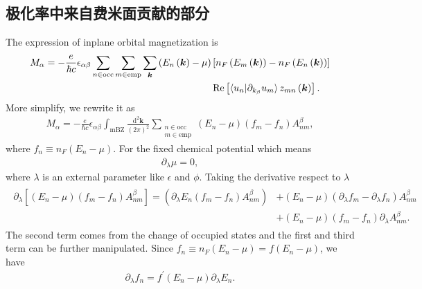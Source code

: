\documentclass[10pt, oneside]{article}
\begin{document}
\subsection{极化率中来自费米面贡献的部分}
The expression of inplane orbital magnetization is 
\begin{align}
	\begin{split}
		M_{\alpha} = -\frac{e }{\hbar c } \epsilon_{\alpha \beta} \sum_{n \in \mathrm{occ}} \sum_{m \in \mathrm{emp}} \sum_{\bm{k}} \left(E_{n } \left(\bm{k }\right) - \mu\right) & \left[n_{F } \left(E_{m } \left(\bm{k }\right)\right) - n_{F } \left(E_{n } \left(\bm{k }\right)\right)\right] \\
		& \operatorname{Re} \left[\braket{u_{n } | \partial_{k_{\beta}} u_{m} } z_{mn } \left(\bm{k }\right)	 \right].
	\end{split}
\end{align}
More simplify, we rewrite it as 
\begin{align}
	M_{\alpha} = -\frac{e }{\hbar c } \epsilon_{\alpha \beta} \int_{\mathrm{mBZ}} \frac{\mathrm{d}^{2} \bm{k}}{\left(2 \pi\right)^2} \sum_{\substack{n \in \mathrm{occ} \\ m \in \mathrm{emp}}} \left(E_{n } - \mu\right) \left(f_{m } - f_{n }\right) A^{\beta}_{nm },
\end{align}
where \(f_{n } \equiv n_{F } \left(E_{n } - \mu\right)\). For the fixed chemical potential which means 
\begin{align}
	\partial_{\lambda} \mu = 0,
\end{align}
where \(\lambda\) is an external parameter like \(\epsilon\) and \(\phi\). Taking the derivative respect to \(\lambda\) 
\begin{align}
	\begin{split}
		\partial_{\lambda} \left[ \left(E_{n } - \mu\right) \left(f_{m } - f_{n }\right) A^{\beta}_{nm }\right] = \left(\partial_{\lambda} E_{n } \left(f_{m } - f_{n }\right) A^{\beta}_{nm } \right) & +  \left(E_{n } - \mu\right) \left( \partial_{\lambda} f_{m } - \partial_{\lambda} f_{n }\right) A^{\beta}_{nm } \\
		& + \left(E_{n } - \mu\right)  \left(f_{m } - f_{n }\right) \partial_{\lambda} A^{\beta}_{nm }.
	\end{split}
\end{align}
The second term comes from the change of occupied states and the first and third term can be further manipulated. Since \(f_{n } \equiv n_F \left(E_{n } - \mu\right) = f \left(E_{n } - \mu\right)\), we have 
\begin{align}
	\partial_{\lambda} f_{n } = f^{\prime} \left(E_{n } - \mu\right) \partial_{\lambda} E_{n }.
\end{align}
\end{document}
